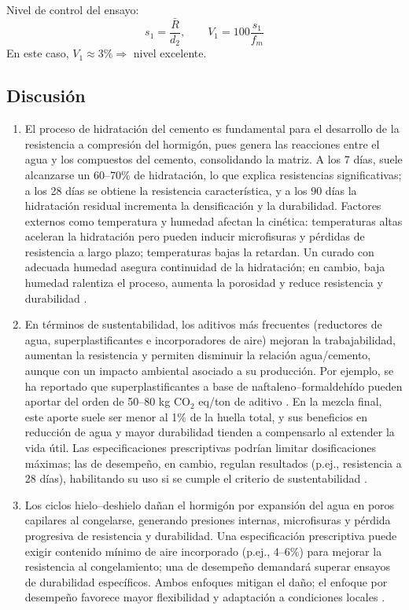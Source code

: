 \noindent Nivel de control del ensayo:
\begin{equation}
    s_1 = \frac{\bar{R}}{d_2}, \qquad V_1 = 100 \frac{s_1}{f_m}
\end{equation}
En este caso, $V_1 \approx 3\% \Rightarrow$ nivel excelente.




\subsection{Discusión}

\begin{enumerate}
    \item El proceso de hidratación del cemento es fundamental para el desarrollo de la resistencia a compresión del hormigón, pues genera las reacciones entre el agua y los compuestos del cemento, consolidando la matriz. A los 7 días, suele alcanzarse un 60--70\% de hidratación, lo que explica resistencias significativas; a los 28 días se obtiene la resistencia característica, y a los 90 días la hidratación residual incrementa la densificación y la durabilidad. Factores externos como temperatura y humedad afectan la cinética: temperaturas altas aceleran la hidratación pero pueden inducir microfisuras y pérdidas de resistencia a largo plazo; temperaturas bajas la retardan. Un curado con adecuada humedad asegura continuidad de la hidratación; en cambio, baja humedad ralentiza el proceso, aumenta la porosidad y reduce resistencia y durabilidad \citep{NCh170-2016}.
    
    \item En términos de sustentabilidad, los aditivos más frecuentes (reductores de agua, superplastificantes e incorporadores de aire) mejoran la trabajabilidad, aumentan la resistencia y permiten disminuir la relación agua/cemento, aunque con un impacto ambiental asociado a su producción. Por ejemplo, se ha reportado que superplastificantes a base de naftaleno–formaldehído pueden aportar del orden de 50--80 kg CO$_2$ eq/ton de aditivo \citep{Habert2011,Flower2007}. En la mezcla final, este aporte suele ser menor al 1\% de la huella total, y sus beneficios en reducción de agua y mayor durabilidad tienden a compensarlo al extender la vida útil. Las especificaciones prescriptivas podrían limitar dosificaciones máximas; las de desempeño, en cambio, regulan resultados (p.ej., resistencia a 28 días), habilitando su uso si se cumple el criterio de sustentabilidad \citep{NCh170-2016}.
    
    \item Los ciclos hielo–deshielo dañan el hormigón por expansión del agua en poros capilares al congelarse, generando presiones internas, microfisuras y pérdida progresiva de resistencia y durabilidad. Una especificación prescriptiva puede exigir contenido mínimo de aire incorporado (p.ej., 4--6\%) para mejorar la resistencia al congelamiento; una de desempeño demandará superar ensayos de durabilidad específicos. Ambos enfoques mitigan el daño; el enfoque por desempeño favorece mayor flexibilidad y adaptación a condiciones locales \citep{Powers1954,MehtaMonteiro2014}.
    

\end{enumerate}
